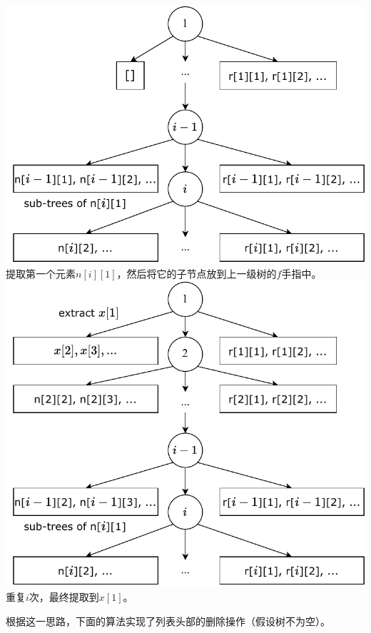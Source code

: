 \documentclass[b5paper]{ctexart}
\begin{document}
\begin{Answer}
{\begin{center}
  \includegraphics[scale=0.4]{img/ftr-illed-2} \\
  提取第一个元素$n[i][1]$，然后将它的子节点放到上一级树的$f$手指中。\\
  \includegraphics[scale=0.4]{img/ftr-illed-i} \\
  重复$i$次，最终提取到$x[1]$。\\
  \label{fig:ftr-illed-extract}
\end{center}

根据这一思路，下面的算法实现了列表头部的删除操作（假设树不为空）。

}
\end{Answer}
\end{document}
